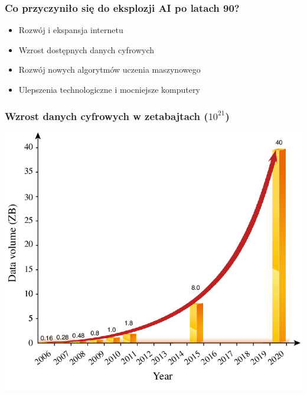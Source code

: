 \documentclass[smaller]{beamer}
\begin{document}

\begin{frame}
\frametitle{Co przyczyniło się do eksplozji AI po latach 90?}

\begin{itemize}
    \item[\textcolor{green}{\checkmark}] Rozwój i ekspansja internetu
    \item[\textcolor{green}{\checkmark}] Wzrost dostępnych danych cyfrowych
    \item[\textcolor{green}{\checkmark}] Rozwój nowych algorytmów uczenia maszynowego
    \item[\textcolor{green}{\checkmark}] Ulepszenia technologiczne i mocniejsze komputery
\end{itemize}

\end{frame}


\begin{frame}
\frametitle{Wzrost danych cyfrowych w zetabajtach (\(10^{21}\))}
\includegraphics[width=\textwidth,height=0.8\textheight,keepaspectratio]{../manifest/data-growth.png}
\end{frame}

\end{document}
